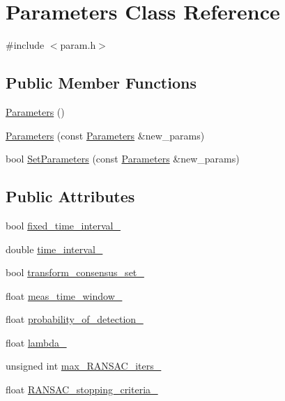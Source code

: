 \hypertarget{classrransac_1_1Parameters}{}\section{Parameters Class Reference}
\label{classrransac_1_1Parameters}


{\ttfamily \#include $<$param.\+h$>$}

\subsection*{Public Member Functions}
\begin{DoxyCompactItemize}
\item 
\hyperlink{classrransac_1_1Parameters_a061bbedbf4fbd963871a388f5e8ebb61}{Parameters} ()
\item 
\hyperlink{classrransac_1_1Parameters_aa1af3b01b19d5fe7701a6752f9186a8d}{Parameters} (const \hyperlink{classrransac_1_1Parameters}{Parameters} \&new\+\_\+params)
\item 
bool \hyperlink{classrransac_1_1Parameters_a679a9b6cf5394758b9340194c724d7ec}{Set\+Parameters} (const \hyperlink{classrransac_1_1Parameters}{Parameters} \&new\+\_\+params)
\end{DoxyCompactItemize}
\subsection*{Public Attributes}
\begin{DoxyCompactItemize}
\item 
bool \hyperlink{classrransac_1_1Parameters_a7422302181eca54e8d7a2542ed775436}{fixed\+\_\+time\+\_\+interval\+\_\+}
\item 
double \hyperlink{classrransac_1_1Parameters_a436968a7b7d79bfb60b1dd0ebb4abee3}{time\+\_\+interval\+\_\+}
\item 
bool \hyperlink{classrransac_1_1Parameters_a88667595f4ccf6048a0257e49f5adbf5}{transform\+\_\+consensus\+\_\+set\+\_\+}
\item 
float \hyperlink{classrransac_1_1Parameters_a8987bc5bc3e7bbd7ed6233cc0cf6c58f}{meas\+\_\+time\+\_\+window\+\_\+}
\item 
float \hyperlink{classrransac_1_1Parameters_abf6cddca971bcdcbddb5910c275242db}{probability\+\_\+of\+\_\+detection\+\_\+}
\item 
float \hyperlink{classrransac_1_1Parameters_a9641ef02cbdcbde767036579f6023476}{lambda\+\_\+}
\item 
unsigned int \hyperlink{classrransac_1_1Parameters_a6974d80270ce8aff078dee4b6c591431}{max\+\_\+\+R\+A\+N\+S\+A\+C\+\_\+iters\+\_\+}
\item 
float \hyperlink{classrransac_1_1Parameters_a08b9e2dd746364297730dda857bdfaea}{R\+A\+N\+S\+A\+C\+\_\+stopping\+\_\+criteria\+\_\+}
\end{DoxyCompactItemize}


